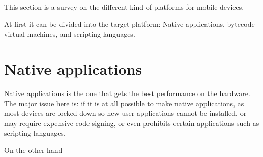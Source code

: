 This section is a survey on the different kind of platforms for mobile devices.

At first it can be divided into the target platform: Native applications, bytecode virtual machines, and scripting languages.

\section{Native applications}
Native applications is the one that gets the best performance on the hardware. The major issue here is: if it is at all possible to make native applications, as most devices are locked down so new user applications cannot be installed, or may require expensive code signing\cite{symbian-signed, brew}, or even prohibits certain applications such as scripting languages\cite{apple-no-language}.

On the other hand 
